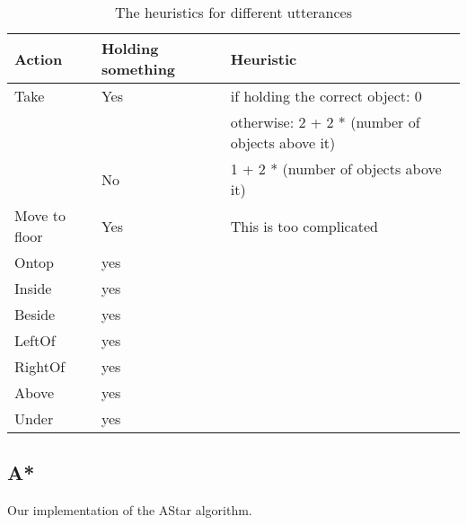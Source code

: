 \begin{table}[h]
    \begin{tabular}{|l|l|l|}
    \hline
    Action        & Holding something & Heuristic                      \\ \hline
    Take          & Yes               & if holding the correct object: 0\\
                  &                   & otherwise: 2 + 2 *
                                        (number of objects above it)   \\ \hline
                  & No                & 1 + 2 * (number of objects
                                        above it)                      \\ \hline
    Move to floor & Yes               & This is too complicated        \\ \hline
    Ontop         & yes               &                                \\ \hline
    Inside        & yes               &                                \\ \hline
    Beside        & yes               &                                \\ \hline
    LeftOf        & yes               &                                \\ \hline
    RightOf       & yes               &                                \\ \hline
    Above         & yes               &                                \\ \hline
    Under         & yes               &                                \\ \hline
    \end{tabular}
    \caption{The heuristics for different utterances}
\label{tab:heuristics}
\end{table}

\subsection*{A*}
Our implementation of the AStar algorithm.


